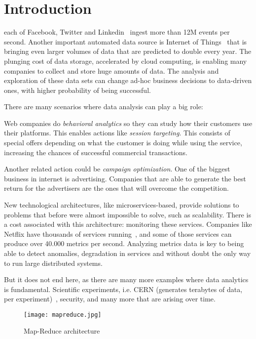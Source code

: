 \chapter{Introduction}
\label{chap:introduction}

 each of Facebook, Twitter and Linkedin~\cite{facebook, twitter, linkedin}
ingest more than 12M events per second. Another important automated data source
is Internet of Things~\cite{iot} that is bringing even larger volumes of data
that are predicted to double every year. The plunging cost of data storage,
accelerated by cloud computing, is enabling many companies to collect and store
huge amounts of data. The analysis and exploration of these data sets can change
ad-hoc business decisions to data-driven ones, with higher probability of being
successful.

\noindent
There are many scenarios where data analysis can play a big role:

Web companies do \textit{behavioral analytics} so they can study how their customers use
their platforms. This enables actions like \textit{session targeting}. This consists of
special offers depending on what the customer is doing while using the service,
increasing the chances of successful commercial transactions.

Another related action could be \textit{campaign optimization}. One of the biggest
business in internet is advertising. Companies that are able to generate the best
return for the advertisers are the ones that will overcome the competition.

New technological architectures, like microservices-based, provide solutions to
problems that before were almost impossible to solve, such as scalability. There is
a cost associated with this architecture: monitoring these services. Companies
like Netflix have thousands of services running~\cite{netflix}, and some of those
services can produce over 40.000 metrics per second. Analyzing metrics data is
key to being able to detect anomalies, degradation in services and without doubt
the only way to run large distributed systems.

But it does not end here, as there are many more examples where data analytics
is fundamental. Scientific experiments, i.e. CERN (generates terabytes of data, per
experiment)~\cite{cern}, security, and many more that are arising over time.

\begin{figure}[!h]
\begin{center}
\texttt{[image: mapreduce.jpg]}
\caption{Map-Reduce architecture~\cite{mapreduce}}
\label{fig:mapreduce}
\end{center}
\end{figure}

